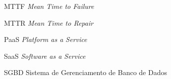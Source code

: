 

\begin{simbolos} \itemsep -1pt

	\item[MTTF] \emph{Mean Time to Failure}
	\item[MTTR] \emph{Mean Time to Repair}
	\item[PaaS] \emph{Platform as a Service}
	\item[SaaS] \emph{Software as a Service}
	\item[SGBD] Sistema de Gerenciamento de Banco de Dados

\end{simbolos}
